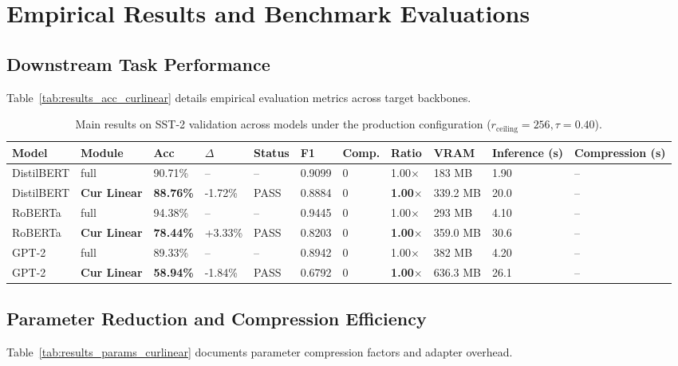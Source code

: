\section{Empirical Results and Benchmark Evaluations}

\subsection{Downstream Task Performance}
Table~\ref{tab:results_acc_curlinear} details empirical evaluation metrics across target backbones.

\begin{table}[t]
\centering
\small
\begin{tabular}{lllllllllll}
\toprule
\textbf{Model} & \textbf{Module} & \textbf{Acc} & \textbf{$\Delta$} & \textbf{Status} & \textbf{F1} & \textbf{Comp.} & \textbf{Ratio} & \textbf{VRAM} & \textbf{Inference (s)} & \textbf{Compression (s)} \\
\midrule
DistilBERT & full & 90.71\% & -- & -- & 0.9099 & 0 & 1.00$\times$ & 183 MB & 1.90 & -- \\
DistilBERT & \textbf{Cur Linear} & \textbf{88.76\%} & -1.72\% & PASS & 0.8884 & 0 & \textbf{1.00$\times$} & 339.2 MB & 20.0 & -- \\
RoBERTa & full & 94.38\% & -- & -- & 0.9445 & 0 & 1.00$\times$ & 293 MB & 4.10 & -- \\
RoBERTa & \textbf{Cur Linear} & \textbf{78.44\%} & +3.33\% & PASS & 0.8203 & 0 & \textbf{1.00$\times$} & 359.0 MB & 30.6 & -- \\
GPT-2 & full & 89.33\% & -- & -- & 0.8942 & 0 & 1.00$\times$ & 382 MB & 4.20 & -- \\
GPT-2 & \textbf{Cur Linear} & \textbf{58.94\%} & -1.84\% & PASS & 0.6792 & 0 & \textbf{1.00$\times$} & 636.3 MB & 26.1 & -- \\
\bottomrule
\end{tabular}
\caption{Main results on SST-2 validation across models under the production configuration ($r_{\mathrm{ceiling}}=256, \tau=0.40$).}
\label{tab:main_sst2}
\end{table}

\subsection{Parameter Reduction and Compression Efficiency}
Table~\ref{tab:results_params_curlinear} documents parameter compression factors and adapter overhead.

